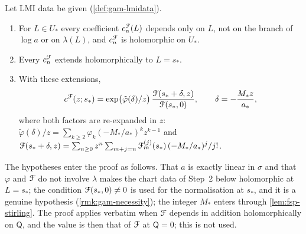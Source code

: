 
\begin{thm}
\label{thm:gam-lmi}
Let LMI data be given (\cref{def:gam-lmidata}).
\begin{enumerate}
\item For $L\in U_*$ every coefficient $c^{\mathcal{F}}_n(L)$ depends only on $L$, not on the branch of $\log a$ or on $\lambda(L)$, and $c^{\mathcal{F}}_n$ is holomorphic on $U_*$.
\item Every $c^{\mathcal{F}}_n$ extends holomorphically to $L=s_*$.
\item With these extensions,
\begin{equation}
\label{eq:gam-lmi}
c^{\mathcal{F}}(z;s_*)=\exp\bigl(\tilde\varphi(\delta)/z\bigr)\,\frac{\mathcal{F}(s_*+\delta,z)}{\mathcal{F}(s_*,0)},\qquad \delta=-\frac{M_*z}{a_*},
\end{equation}
where both factors are re-expanded in $z$: $\tilde\varphi(\delta)/z=\sum_{k\geq 2}\varphi_k(-M_*/a_*)^kz^{k-1}$ and $\mathcal{F}(s_*+\delta,z)=\sum_{n\geq 0}z^n\sum_{m+j=n}\mathcal{F}_m^{(j)}(s_*)\,(-M_*/a_*)^j/j!$.
\end{enumerate}
\end{thm}

The hypotheses enter the proof as follows. That $a$ is exactly linear in $\sigma$ and that $\varphi$ and $\mathcal{F}$ do not involve $\lambda$ makes the chart data of Step~2 below holomorphic at $L=s_*$; the condition $\mathcal{F}(s_*,0)\neq 0$ is used for the normalisation at $s_*$, and it is a genuine hypothesis (\cref{rmk:gam-necessity}); the integer $M_*$ enters through \cref{lem:fsp-stirling}. The proof applies verbatim when $\mathcal{F}$ depends in addition holomorphically on $\mathsf Q$, and the value is then that of $\mathcal{F}$ at $\mathsf Q=0$; this is not used.

